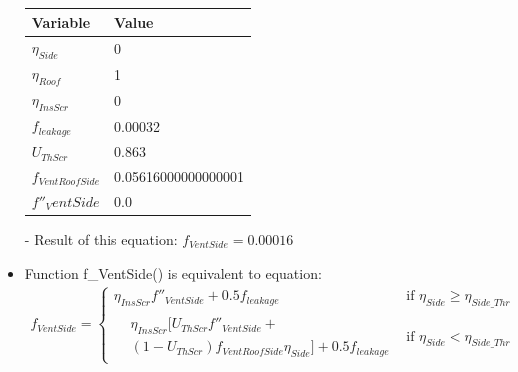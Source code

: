 \documentclass[a4paper]{article}
\begin{document}
\begin{itemize}
        \begin{table}[H]
          \centering
          \begin{tabular}{|l|l|}
            \hline
            \textbf{Variable}    & \textbf{Value}      \\ \hline
            \(\eta_{Side}\)      & 0                   \\ \hline
            \(\eta_{Roof}\)      & 1                   \\ \hline
            \(\eta_{InsScr}\)    & 0                   \\ \hline
            \(f_{leakage}\)      & 0.00032             \\ \hline
            \(U_{ThScr}\)        & 0.863               \\ \hline
            \(f_{VentRoofSide}\) & 0.05616000000000001 \\ \hline
            \(f''_VentSide\)     & 0.0                 \\ \hline
          \end{tabular}
        \end{table}

  \item[-] Result of this equation: \(f_{VentSide} = 0.00016\)

  \item Function f\_VentSide() is equivalent to equation:
        \begin{gather*}
          f_{VentSide} =
          \begin{cases}
            \eta_{InsScr} f''_{VentSide} + 0.5f_{leakage} & \text{if~} \eta_{Side} \geq \eta_{Side\_Thr} \\
            \begin{split}
              & \eta_{InsScr} [U_{ThScr}f''_{VentSide} + \\
              & (1-U_{ThScr})f_{VentRoofSide} \eta_{Side}] + 0.5 f_{leakage}
            \end{split}                   & \text{if~} \eta_{Side} < \eta_{Side\_Thr}
          \end{cases}
        \end{gather*}


\end{itemize}
\end{document}
